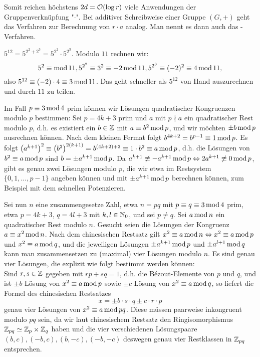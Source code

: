 Somit reichen höchstens $2d = \oh(\log r)$ viele Anwendungen der Gruppenverknüpfung "$\cdot$". 
Bei additiver Schreibweise einer Gruppe $(G,+)$ geht das Verfahren zur Berechnung von $r \cdot a$ analog. 
Man nennt es dann auch das -Verfahren.

\begin{bsp}
	$5^{12} = 5^{2^2+2^3} = 5^{2^2} \cdot 5^{2^3}$. Modulo $11$ rechnen wir:
	\[5^2 \kon  \modu 11, 5^{2^2} \kon 3^2 \kon -2 \modu 11, 5^{2^3} \kon (-2)^2 \kon 4 \modu 11, \]
	also $5^{12} \kon (-2) \cdot 4 \kon 3 \modu 11$. 
	Das geht schneller als $5^{12}$ von Hand auszurechnen und durch $11$ zu teilen.
\end{bsp}

\begin{anw}
	Im Fall $p \kon 3 \modu 4$ prim können wir Lösungen quadratischer Kongruenzen modulo $p$ bestimmen: Sei $p = 4k+3$ prim und $a$ mit $p \nmid a$ ein quadratischer Rest modulo $p$, d.h. es existiert ein $b \in \ZZ$ mit $a \kon b^2 \modu p$, und wir möchten $\pm b \modu p$ ausrechnen können. 
	Nach dem kleinen Fermat folgt $b^{4k+2} = b^{p-1} \kon 1 \modu p$. 
	Es folgt $\enbrace*{a^{k+1}}^2 \kon \enbrace*{b^2}^{2(k+1)} = b^{(4k+2)+2} \kon 1 \cdot b^2 \kon a \modu p$, d.h. die Lösungen von $b^2 \kon a \modu p$ sind $b = \pm a^{k+1} \modu p$. 
	Da $a^{k+1} \not\kon -a^{k+1} \modu p \Leftrightarrow 2a^{k+1} \not\kon 0 \modu p$, gibt es genau zwei Lösungen modulo $p$, die wir etwa im Restsystem $\{0,1,\dots,p-1\}$ angeben können und mit $\pm a^{k+1} \modu p$ berechnen können, zum Beispiel mit dem schnellen Potenzieren.
\end{anw}

\begin{anw}
\label{anw_1.1.3.14}
	Sei nun $n$ eine zusammengesetze Zahl, etwa $n = pq$ mit $p \kon q \kon 3 \modu 4$ prim, etwa $p = 4k+3$, $q = 4l+3$ mit $k,l \in \NN_0$, und sei $p \neq q$. 
	Sei $a \modu n$ ein quadratischer Rest modulo $n$. 
	Gesucht seien die Lösungen der Kongruenz $a \kon x^2 \modu n$. 
	Nach dem chinesischen Restsatz gilt $x^2 \kon a \modu n \Leftrightarrow x^2 \kon a \modu p$ und $x^2 \kon a \modu q$, und die jeweiligen Lösungen $\pm a^{k+1} \modu p$ und $\pm a^{l+1} \modu q$ kann man zusammensetzen zu (maximal) vier Lösungen modulo $n$. 
	Es sind genau vier Lösungen, die explizit wie folgt bestimmt werden können: \\
	Sind $r,s \in \ZZ$ gegeben mit $rp + sq = 1$, d.h. die Bézout-Elemente von $p$ und $q$, und ist $\pm b$ Lösung von $x^2 \kon a \modu p$ sowie $\pm c$ Lösung von $x^2 \kon a \modu q$, so liefert die Formel des chinesischen Restsatzes
	\[ x = \pm b\cdot s \cdot q \pm c \cdot r \cdot p \]
	genau vier Lösungen von $x^2 \kon a \modu pq$. 
	Diese müssen paarweise inkongruent modulo $pq$ sein, da wir laut chinesischem Restsatz den Ringisomorphismus $\ZZ_{pq} \simeq \ZZ_p \times \ZZ_q$ haben und die vier verschiedenen Lösungspaare $(b,c), (-b,c), (b,-c), (-b,-c)$ deswegen genau vier Restklassen in $\ZZ_{pq}$ entsprechen.
\end{anw}

